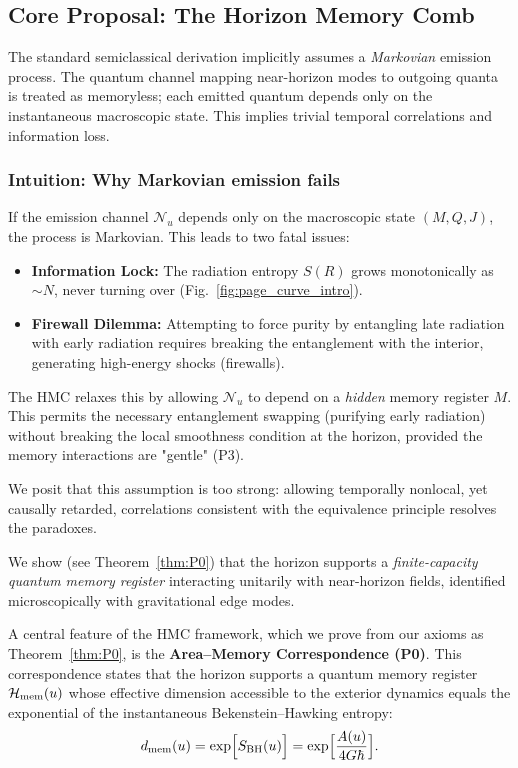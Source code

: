 \documentclass[aps,prd,preprint,onecolumn,superscriptaddress,nofootinbib,longbibliography,floatfix,11pt,showpacs,showkeys]{revtex4-2}
\newcommand{\HMC}{\textsc{HMC}\xspace}
\theoremstyle{plain}
\theoremstyle{definition}
\theoremstyle{remark}
\begin{document}
\subsection{Core Proposal: The Horizon Memory Comb}

The standard semiclassical derivation implicitly assumes a \emph{Markovian} emission process. The quantum channel mapping near-horizon modes to outgoing quanta is treated as memoryless; each emitted quantum depends only on the instantaneous macroscopic state. This implies trivial temporal correlations and information loss.

\subsubsection{Intuition: Why Markovian emission fails}
If the emission channel $\mathcal{N}_u$ depends only on the macroscopic state $(M,Q,J)$, the process is Markovian.
This leads to two fatal issues:
\begin{itemize}
    \item \textbf{Information Lock:} The radiation entropy $S(R)$ grows monotonically as $\sim N$, never turning over (Fig.~\ref{fig:page_curve_intro}).
    \item \textbf{Firewall Dilemma:} Attempting to force purity by entangling late radiation with early radiation requires breaking the entanglement with the interior, generating high-energy shocks (firewalls).
\end{itemize}
The HMC relaxes this by allowing $\mathcal{N}_u$ to depend on a \emph{hidden} memory register $M$. This permits the necessary entanglement swapping (purifying early radiation) without breaking the local smoothness condition at the horizon, provided the memory interactions are "gentle" (P3).

We posit that this assumption is too strong: allowing temporally nonlocal, yet causally retarded, correlations consistent with the equivalence principle resolves the paradoxes.

We show (see Theorem~\ref{thm:P0}) that the horizon supports a \emph{finite-capacity quantum memory register} interacting unitarily with near-horizon fields, identified microscopically with gravitational edge modes.

A central feature of the \HMC{} framework, which we prove from our axioms as Theorem~\ref{thm:P0}, is the \textbf{Area--Memory Correspondence (P0)}. This correspondence states that the horizon supports a quantum memory register $\mathcal{H}_{\rm mem}(u)$ whose effective dimension accessible to the exterior dynamics equals the exponential of the instantaneous Bekenstein--Hawking entropy:
\begin{equation}
    d_{\rm mem}(u)=\exp\!\Big[S_{\rm BH}(u)\Big] = \exp\!\Big[\frac{A(u)}{4G\hbar}\Big].
    \label{eq:mem-dim}
\end{equation}
\end{document}
